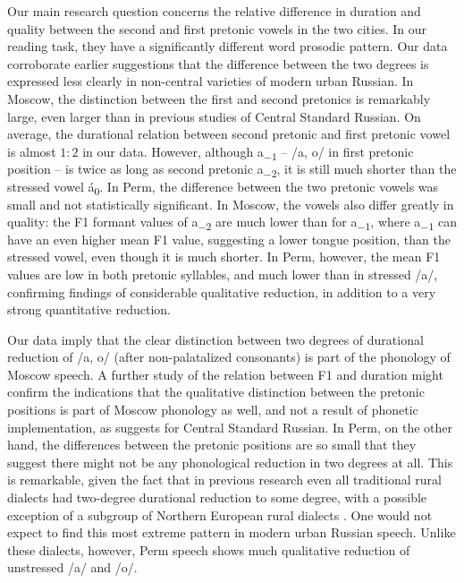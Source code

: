 \documentclass[output=paper,colorlinks,citecolor=black]{langscibook}
\begin{document}
Our main research question concerns the relative difference in duration and quality between the second and first pretonic vowels in the two cities. In our reading task, they have a significantly different word prosodic pattern. Our data corroborate earlier suggestions that the difference between the two degrees is expressed less clearly in non-central varieties of modern urban Russian. In Moscow, the distinction between the first and second pretonics is remarkably large, even larger than in previous studies of Central Standard Russian. On average, the durational relation between second pretonic and first pretonic vowel is almost $1 : 2$ in our data. However, although a\textsubscript{\tiny{$-1$}} -- /a, o/ in first pretonic position -- is twice as long as second pretonic a\textsubscript{\tiny{$-2$}}, it is still much shorter than the stressed vowel á\textsubscript{\tiny{$0$}}. In Perm, the difference between the two pretonic vowels was small and not statistically significant. In Moscow, the vowels also differ greatly in quality: the F1 formant values of a\textsubscript{\tiny{$-2$}} are much lower than for a\textsubscript{\tiny{$-1$}}, where a\textsubscript{\tiny{$-1$}} can have an even higher mean F1 value, suggesting a lower tongue position, than the stressed vowel, even though it is much shorter. In Perm, however, the mean F1 values are low in both pretonic syllables, and much lower than in stressed /a/, confirming  findings of considerable qualitative reduction, in addition to a very strong quantitative reduction.

Our data imply that the clear distinction between two degrees of durational reduction of /a, o/ (after non-palatalized consonants) is part of the phonology of Moscow speech. A further study of the relation between F1 and duration might confirm the indications that the qualitative distinction between the pretonic positions is part of Moscow phonology as well, and not a result of phonetic implementation, as \citet{Barnes2006} suggests for Central Standard Russian. In Perm, on the other hand, the differences between the pretonic positions are so small that they suggest there might not be any phonological reduction in two degrees at all. This is remarkable, given the fact that in previous research even all traditional rural dialects had two-degree durational reduction to some degree, with a possible exception of a subgroup of Northern European rural dialects \citep{Vysotskij1973}. One would not expect to find this most extreme pattern in modern urban Russian speech. Unlike these dialects, however, Perm speech shows much qualitative reduction of unstressed /a/ and /o/.
\end{document}
